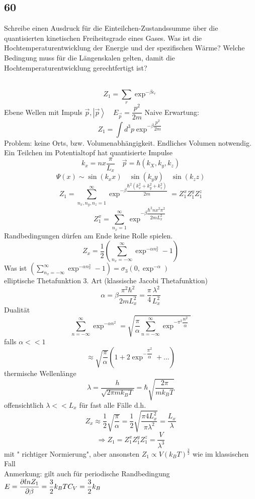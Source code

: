 \subsection{60}
\begin{myfrag}
Schreibe einen Ausdruck für die Einteilchen-Zustandssumme über die
quantisierten kinetischen Freiheitsgrade eines Gases. Was ist die
Hochtemperaturentwicklung der Energie und der spezifischen Wärme?
Welche Bedingung muss für die Längenskalen gelten, damit die
Hochtemperaturentwicklung gerechtfertigt ist?
\end{myfrag} \quad \\
$$ Z_1 = \sum \limits _r \exp ^{-\beta \epsilon_r}$$
Ebene Wellen mit Impuls $\vec{p} ,\left| \vec{p} \right\rangle \quad E_{\vec{p}} = \dfrac{p^2}{2m}$
Naive Erwartung: $$ Z_1 = \int d^3 p \exp ^{-\beta \dfrac{p^2}{2m} } $$
Problem: keine Orts, bzw. Volumenabhängigkeit. Endliches Volumen notwendig. \\[1ex]
Ein Teilchen im Potentialtopf hat quantisierte Impulse
$$ k_x = n x \dfrac{\pi}{L_x} \quad \vec{p} = \hbar(k_X,k_y,k_z) $$
$$ \Psi(x) \sim \sin (k_x x) \quad \sin (k_y y) \quad \sin (k_z z)$$
$$ Z_1 = \sum \limits _{n_x,n_y,n_z=1}^\infty \exp ^{ -\beta \dfrac{\hbar ^2 ( k_x^2 + k_y ^2 + k_z ^2)}{2m}} = Z_1^x Z_1^y Z_1^z$$
$$ Z_1 ^x = \sum \limits _{n_x = 1} ^\infty \exp ^{-\beta \dfrac{\hbar ^2 n x^2 \pi^2}{2m L_x^2}}$$
Randbedingungen dürfen am Ende keine Rolle spielen.
$$ Z_x = \dfrac{1}{2} \left( \sum \limits _{n_x = - \infty } ^\infty \exp ^ { - \alpha n_x ^2} -1 \right)$$
Was ist \qquad $\left( \sum \limits _{n_x = - \infty } ^\infty \exp ^ { - \alpha n_x ^2} -1 \right) = \sigma _3 (0, \exp ^{- \alpha } ) $ \\ elliptische Thetafunktion 3. Art (klassische Jacobi Thetafunktion)
$$ \alpha = \beta \dfrac{\pi ^2 \hbar ^2}{2m L_x ^2} = \dfrac{\pi}{4} \dfrac{\lambda ^2}{L_x^2}$$
Dualität 
$$\sum \limits _{n = - \infty } ^\infty \exp ^ { - \alpha n^2} = \sqrt{\dfrac{\pi}{\alpha} \sum \limits _{n = - \infty } ^\infty \exp ^ { - \pi ^2 \dfrac{n^2}{\alpha}}}$$
falls $\alpha << 1$ 
$$ \approx \sqrt{\dfrac{\pi}{\alpha }} \left( 1+ 2 \exp ^{ -\dfrac{\pi ^2}{\alpha } } + ...\right) $$
thermische Wellenlänge
$$ \lambda = \dfrac{h}{\sqrt{2 \pi m k_B T}} = \hbar \sqrt{\dfrac{2\pi}{m k_B T}} $$
offensichtlich $ \lambda << L_x$ für fast alle Fälle d.h. 
$$Z_x \approx \dfrac{1}{2} \sqrt{\dfrac{\pi}{\alpha}} = \dfrac{1}{2} \sqrt{\dfrac{\pi 4 L_x^2}{\pi \lambda ^2}} = \dfrac{L_x}{\lambda }$$
$$ \Rightarrow Z_1 = Z_1^x Z_1^y Z_1^z = \dfrac{V}{\lambda ^3} $$ 
mit " richtiger Normierung", aber ansonsten $Z_1 \propto V(k_B T ) ^\frac{3}{2} $ wie im klassischen Fall \\
Anmerkung: gilt auch für periodische Randbedingung \\[1.5ex]
$ E = \dfrac{\partial ln Z_1}{\partial \beta} = \dfrac{3}{2} k_B T \\[1.5ex]
C_V = \dfrac{3}{2} k_B$
